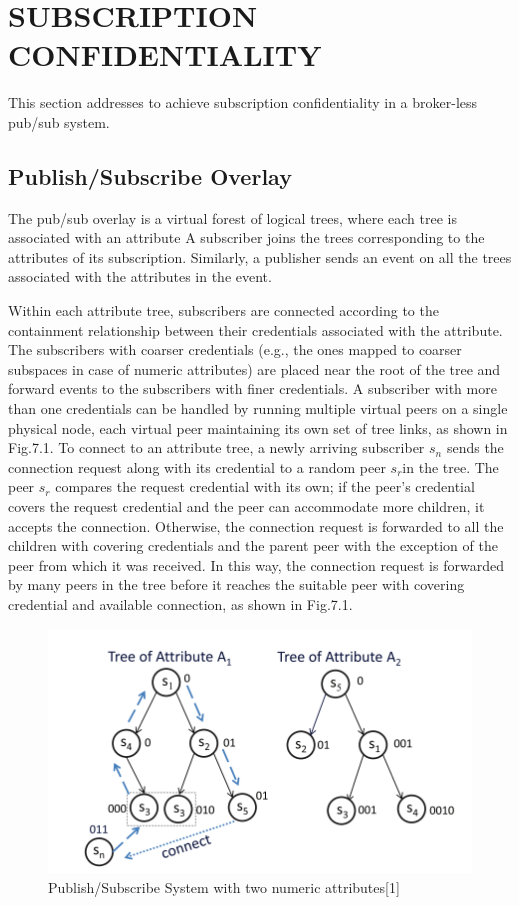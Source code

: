 \documentclass[MTech]{iitmdiss}
\begin{document}
\chapter{SUBSCRIPTION CONFIDENTIALITY}
This section addresses to achieve subscription confidentiality in a broker-less pub/sub system.
\section{Publish/Subscribe Overlay}
The pub/sub overlay is a virtual forest of logical trees,
where each tree is associated with an attribute  A subscriber joins the trees corresponding to the attributes of
its subscription. Similarly, a publisher sends an event on all
the trees associated with the attributes in the event.


Within each attribute tree, subscribers are connected
according to the containment relationship between their
credentials associated with the attribute. The subscribers
with coarser credentials (e.g., the ones mapped to coarser
subspaces in case of numeric attributes) are placed near the
root of the tree and forward events to the subscribers with
finer credentials. A subscriber with more than one
credentials can be handled by running multiple virtual
peers on a single physical node, each virtual peer maintaining its own set of tree links, as shown in Fig.7.1. To
connect to an attribute tree, a newly arriving subscriber $s_n$
sends the connection request along with its credential to a
random peer $s_r$in the tree. The peer $s_r$ compares the request
credential with its own; if the peer’s credential covers the
request credential and the peer can accommodate more
children, it accepts the connection. Otherwise, the connection request is forwarded to all the children with covering
credentials and the parent peer with the exception of the
peer from which it was received. In this way, the connection
request is forwarded by many peers in the tree before it
reaches the suitable peer with covering credential and
available connection, as shown in Fig.7.1.
\newpage
\vspace*{10pt}
 \begin{figure}[htp]
\centering
\includegraphics[scale=0.45]{pubsub.png}
\caption{\label{a}Publish/Subscribe System with two numeric attributes[1] }
\end{figure}
\end{document}
